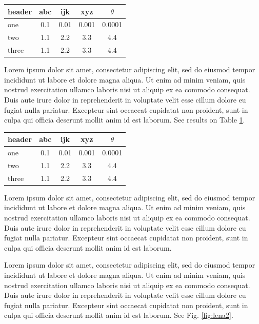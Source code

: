 \documentclass[10pt,twoside,twocolumn,a4paper]{article}
\begin{document}
\begin{table}
\label{tab:results}
\begin{tabular}{l|c|c|c|c}
\hline
header & abc & ijk & xyz & $\theta$ \\
\hline \hline
one & 0.1 & 0.01 & 0.001 & 0.0001\\ 
\hline
two & 1.1 & 2.2 & 3.3 & 4.4\\
\hline
three & 1.1 & 2.2 & 3.3 & 4.4\\
\hline
\end{tabular}
\end{table}

Lorem ipsum dolor sit amet, consectetur adipiscing elit, sed do eiusmod tempor incididunt ut labore et dolore magna aliqua. Ut enim ad minim veniam, quis nostrud exercitation ullamco laboris nisi ut aliquip ex ea commodo consequat. Duis aute irure dolor in reprehenderit in voluptate velit esse cillum dolore eu fugiat nulla pariatur. Excepteur sint occaecat cupidatat non proident, sunt in culpa qui officia deserunt mollit anim id est laborum. See results on Table \ref{tab:results}.

\begin{table}
\label{tab:results1}
\begin{tabular}{l|c|c|c|c}
\hline
header & abc & ijk & xyz & $\theta$ \\
\hline \hline
one & 0.1 & 0.01 & 0.001 & 0.0001\\ 
\hline
two & 1.1 & 2.2 & 3.3 & 4.4\\
\hline
three & 1.1 & 2.2 & 3.3 & 4.4\\
\hline
\end{tabular}
\end{table}

Lorem ipsum dolor sit amet, consectetur adipiscing elit, sed do eiusmod tempor incididunt ut labore et dolore magna aliqua. Ut enim ad minim veniam, quis nostrud exercitation ullamco laboris nisi ut aliquip ex ea commodo consequat. Duis aute irure dolor in reprehenderit in voluptate velit esse cillum dolore eu fugiat nulla pariatur. Excepteur sint occaecat cupidatat non proident, sunt in culpa qui officia deserunt mollit anim id est laborum.

Lorem ipsum dolor sit amet, consectetur adipiscing elit, sed do eiusmod tempor incididunt ut labore et dolore magna aliqua. Ut enim ad minim veniam, quis nostrud exercitation ullamco laboris nisi ut aliquip ex ea commodo consequat. Duis aute irure dolor in reprehenderit in voluptate velit esse cillum dolore eu fugiat nulla pariatur. Excepteur sint occaecat cupidatat non proident, sunt in culpa qui officia deserunt mollit anim id est laborum. See Fig. \ref{fig:lena2}.
\end{document}
